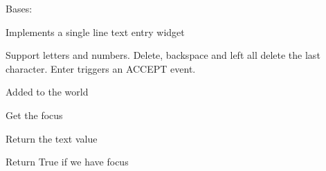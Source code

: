 \documentclass[letterpaper,10pt,english]{sphinxmanual}
\begin{document}
\begin{fulllineitems}
\label{blocks:serge.blocks.actors.TextEntryWidget}
Bases: {\hyperref[actor:serge.actor.MountableActor]{}}

Implements a single line text entry widget

Support letters and numbers. Delete, backspace and left all delete the last
character. Enter triggers an ACCEPT event.

\begin{fulllineitems}
\label{blocks:serge.blocks.actors.TextEntryWidget.addedToWorld}
Added to the world

\end{fulllineitems}


\begin{fulllineitems}
\label{blocks:serge.blocks.actors.TextEntryWidget.getFocus}
Get the focus

\end{fulllineitems}


\begin{fulllineitems}
\label{blocks:serge.blocks.actors.TextEntryWidget.getText}
Return the text value

\end{fulllineitems}


\begin{fulllineitems}
\label{blocks:serge.blocks.actors.TextEntryWidget.hasFocus}
Return True if we have focus

\end{fulllineitems}


\end{fulllineitems}
\end{document}
